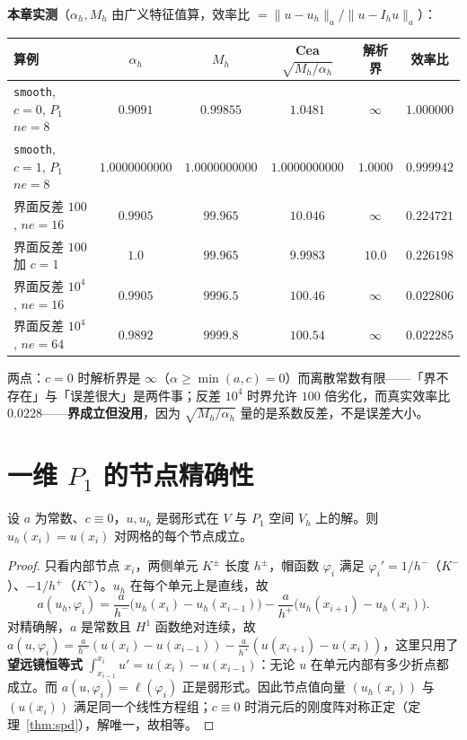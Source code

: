 \textbf{本章实测}（$\alpha_h,M_h$ 由广义特征值算，效率比 $=\|u-u_h\|_a/\|u-I_hu\|_a$）：
\begin{center}
\begin{tabular}{lccccc}
\toprule
算例 & $\alpha_h$ & $M_h$ & Cea $\sqrt{M_h/\alpha_h}$ & 解析界 & 效率比 \\
\midrule
\texttt{smooth}, $c=0$, $P_1$ $ne=8$ & $0.9091$ & $0.99855$ & $1.0481$ & $\infty$ & $1.000000$
\\
\texttt{smooth}, $c=1$, $P_1$ $ne=8$ & $1.0000000000$ & $1.0000000000$ & $1.0000000000$ &
$1.0000$ & $0.999942$ \\
界面反差 $100$, $ne=16$ & $0.9905$ & $99.965$ & $10.046$ & $\infty$ & $0.224721$ \\
界面反差 $100$ 加 $c=1$ & $1.0$ & $99.965$ & $9.9983$ & $10.0$ & $0.226198$ \\
界面反差 $10^4$, $ne=16$ & $0.9905$ & $9996.5$ & $100.46$ & $\infty$ & $0.022806$ \\
界面反差 $10^4$, $ne=64$ & $0.9892$ & $9999.8$ & $100.54$ & $\infty$ & $0.022285$ \\
\bottomrule
\end{tabular}
\end{center}
两点：$c=0$ 时解析界是 $\infty$（$\alpha\ge\min(a,c)=0$）而离散常数有限——「界不存在」与「误差很大」是两件事；反差 $10^4$ 时界允许 $100$
倍劣化，而真实效率比 $0.0228$——\textbf{界成立但没用}，因为 $\sqrt{M_h/\alpha_h}$ 量的是系数反差，不是误差大小。

\section{一维 $P_1$ 的节点精确性}

\begin{theorem}[通量平衡与节点精确性]
\label{thm:nodal}
设 $a$ 为常数、$c\equiv0$，$u,u_h$ 是弱形式在 $V$ 与 $P_1$ 空间 $V_h$ 上的解。则 $u_h(x_i)=u(x_i)$ 对网格的每个节点成立。
\end{theorem}
\begin{proof}
只看内部节点 $x_i$，两侧单元 $K^\pm$ 长度 $h^\pm$，帽函数 $\varphi_i$ 满足
$\varphi_i'=1/h^-$（$K^-$）、$-1/h^+$（$K^+$）。$u_h$ 在每个单元上是直线，故
\begin{equation}
  a(u_h,\varphi_i)=\frac{a}{h^-}\bigl(u_h(x_i)-u_h(x_{i-1})\bigr)
  -\frac{a}{h^+}\bigl(u_h(x_{i+1})-u_h(x_i)\bigr).
  \label{eq:flux-disc}
\end{equation}
对精确解，$a$ 是常数且 $H^1$ 函数绝对连续，故
$a(u,\varphi_i)=\frac{a}{h^-}(u(x_i)-u(x_{i-1}))-\frac{a}{h^+}(u(x_{i+1})-u(x_i))$，这里只用了\textbf{望远镜恒等式}
$\int_{x_{i-1}}^{x_i}u'=u(x_i)-u(x_{i-1})$：无论 $u$ 在单元内部有多少折点都成立。而
$a(u,\varphi_i)=\ell(\varphi_i)$ 正是弱形式。因此节点值向量 $(u_h(x_i))$ 与 $(u(x_i))$ 满足同一个线性方程组；$c\equiv0$
时消元后的刚度阵对称正定（定理~\ref{thm:spd}），解唯一，故相等。
\end{proof}

